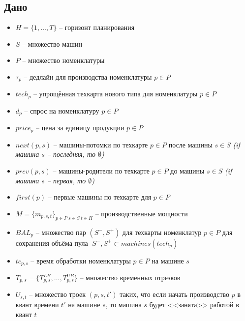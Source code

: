 \documentclass[14pt,fleqn]{extarticle}
\begin{document}
	\subsection*{Дано}
	\renewcommand\labelitemi{$\vcenter{\hbox{\tiny$\bullet$}}$}
	\begin{itemize}[topsep=0pt,itemsep=-1ex,partopsep=1ex,parsep=1ex]
		\item $H = \{1, \dots, T\}$ -- горизонт планирования
		\item $S$ -- множество машин
		\item $P$ -- множество номенклатуры
		\item $\tau_p$ -- дедлайн для производства номенклатуры $p \in P$
		\item $tech_p$ -- упрощённая техкарта нового типа для номенклатуры $p \in P$
		\item $d_p$ -- спрос на номенклатуру $p\in P$
		\item $price_p$ -- цена за единицу продукции $p \in P$
		\item $next(p, s)$ -- машины-потомки по техкарте $p \in P$ после машины $s \in S$ \textit{(if машина $s$ -- последняя, то $\emptyset$)}
		\item $prev(p, s)$ -- машины-родители по техкарте $p \in P$ до машины $s \in S$ \textit{(if машина $s$ -- первая, то $\emptyset$)}
		\item $first(p)$ -- первые машины по техкарте для $p \in P$
		\item $M = \{m_{p, s, t}\}_{p \in P \; s \in S \; t \in H}$ -- производственные мощности
		\item $BAL_p$ -- множество пар $(S^{-}, S^{+})$ для техкарты номенклатур $p \in P$ для сохранения объёма пула $\; S^{-}, S^{+} \subset machines(tech_p)$
		\item $tc_{p, s}$ -- время обработки номенклатуры $p \in P$ на машине $s$
		\item $T_{p, s} = \{T_{p, s}^{LB}, \dots, T_{p, s}^{UB}\}$ -- множество временных отрезков
		\item $U_{s, t}$ -- множество троек $(p, s, t')$ таких, что если начать производство $p$ в квант времени $t'$ на машине $s$, то машина $s$ будет <<занята>> работой в квант $t$
	\end{itemize}
\end{document}
